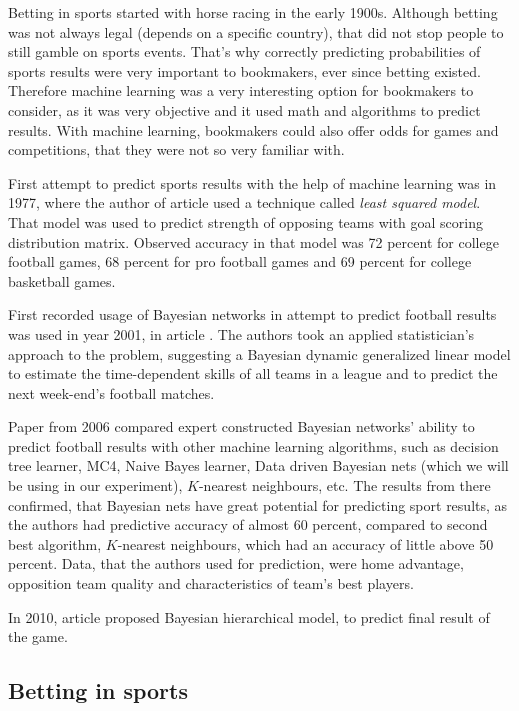 \documentclass[conference]{IEEEtran}
\begin{document}
Betting in sports started with horse racing in the early 1900s. Although betting was 
not always legal (depends on a specific country), that did not stop people to still
gamble on sports events. That's why correctly predicting probabilities of sports 
results were very important to bookmakers, ever since betting existed. Therefore
machine learning was a very interesting option for bookmakers to consider, as it 
was very objective and it used math and algorithms to predict results. With machine 
learning, bookmakers could also offer odds for games and competitions, that they 
were not so very familiar with.

First attempt to predict sports results with the help of machine learning was in
1977, where the author of article \cite{Stefani_1977} used a technique called 
\textit{least squared model}. That model was used to predict strength of opposing 
teams with goal scoring distribution matrix. Observed accuracy in that model 
was 72 percent for college football games, 68 percent for pro 
football games and 69 percent for college basketball games.

First recorded usage of Bayesian networks in attempt to predict football results was used in
year 2001, in article \cite{Rue_2001}. The authors took an applied statistician's 
approach to the problem, suggesting a Bayesian dynamic generalized linear model to 
estimate the time-dependent skills of all teams in a league and to predict the next 
week-end's football matches.

Paper \cite{Joseph_2006} from 2006 compared expert constructed Bayesian networks' 
ability to predict football results with other machine learning algorithms, such as 
decision tree learner, MC4, Naive Bayes learner, Data driven Bayesian nets (which we 
will be using in our experiment), $K$-nearest neighbours, etc. The results from there 
confirmed, that Bayesian nets have great potential for predicting sport results, as the 
authors had predictive accuracy of almost 60 percent, compared to second best algorithm, 
$K$-nearest neighbours, which had an accuracy of little above 50 percent. Data, that 
the authors  used for prediction, were home advantage, opposition team quality and 
characteristics of team's best players.


In 2010, article \cite{Baio_2010} proposed Bayesian hierarchical model, to predict final result 
of the game.

\subsection{Betting in sports}
\end{document}

